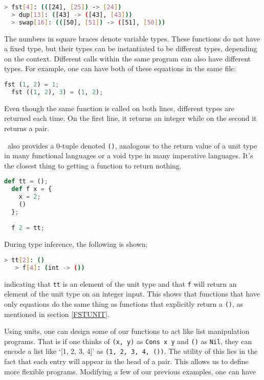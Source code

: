 \begin{lstlisting}[language=bash]
  > fst[4]: (([24], [25]) -> [24])
  > dup[13]: ([43] -> ([43], [43]))
  > swap[16]: (([50], [51]) -> ([51], [50]))
\end{lstlisting}

The numbers in square braces denote variable types. These functions do not have a fixed type, but their types can be instantiated to be different types, depending on the context. Different calls within the same program can also have different types. For example, one can have both of these equations in the same file:

\begin{lstlisting}[language=Python]
  fst (1, 2) = 1;
  fst ((1, 2), 3) = (1, 2);
\end{lstlisting}

Even though the same function is called on both lines, different types are returned each time. On the first line, it returns an integer while on the second it returns a pair.

\label{UNITEXP}
\vampir\ also provides a 0-tuple denoted \lstinline{()}, analogous to the return value of a unit type in many functional languages or a void type in many imperative languages. It's the closest thing to getting a function to return nothing.

\begin{lstlisting}[language=Python]
  def tt = ();
  def f x = {
    x = 2;
    ()
  };

  f 2 = tt;
\end{lstlisting}

During type inference, the following is shown;

\begin{lstlisting}[language=bash]
   > tt[2]: ()
   > f[4]: (int -> ())
\end{lstlisting}

indicating that \lstinline{tt} is an element of the unit type and that \lstinline{f} will return an element of the unit type on an integer input. This shows that functions that have only equations do the same thing as functions that explicitly return a \lstinline{()}, as mentioned in section \ref{FSTUNIT}.

Using units, one can design some of our functions to act like list manipulation programs. That is if one thinks of \lstinline{(x, y)} as \lstinline{Cons x y} and \lstinline{()} as \lstinline{Nil}, they can encode a list like `[1, 2, 3, 4]' as \lstinline{(1, 2, 3, 4, ())}. The utility of this lies in the fact that each entry will appear in the head of a pair. This allows us to define more flexible programs. Modifying a few of our previous examples, one can have

